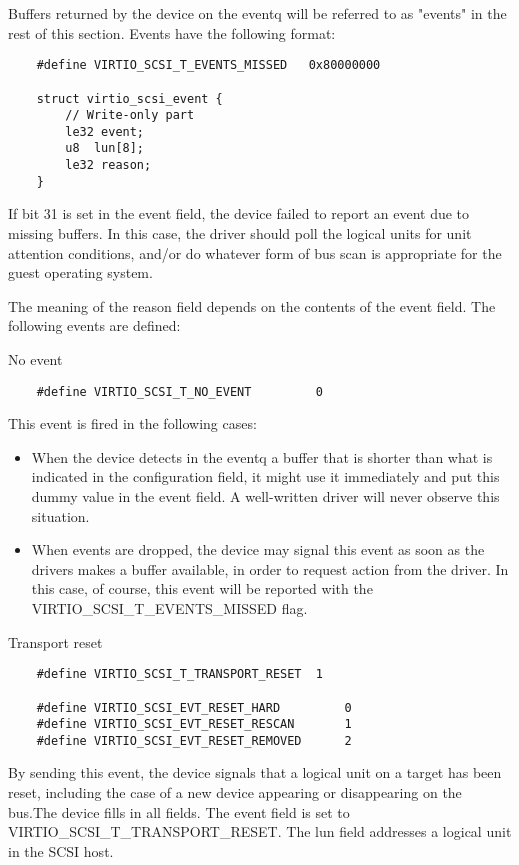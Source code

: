 Buffers returned by the device on the eventq will be referred to
as "events" in the rest of this section. Events have the
following format:

\begin{lstlisting}
	#define VIRTIO_SCSI_T_EVENTS_MISSED   0x80000000

	struct virtio_scsi_event {
		// Write-only part
		le32 event;
		u8  lun[8];
		le32 reason;
	}
\end{lstlisting}

If bit 31 is set in the event field, the device failed to report
an event due to missing buffers. In this case, the driver should
poll the logical units for unit attention conditions, and/or do
whatever form of bus scan is appropriate for the guest operating
system.

The meaning of the reason field depends on the
contents of the event field. The following events are defined:

  No event
\begin{lstlisting}
	#define VIRTIO_SCSI_T_NO_EVENT         0
\end{lstlisting}

  This event is fired in the following cases:

\begin{itemize}
\item When the device detects in the eventq a buffer that is
    shorter than what is indicated in the configuration field, it
    might use it immediately and put this dummy value in the
    event field. A well-written driver will never observe this
    situation.

\item When events are dropped, the device may signal this event as
    soon as the drivers makes a buffer available, in order to
    request action from the driver. In this case, of course, this
    event will be reported with the VIRTIO_SCSI_T_EVENTS_MISSED
    flag.
\end{itemize}

  Transport reset
\begin{lstlisting}
	#define VIRTIO_SCSI_T_TRANSPORT_RESET  1

	#define VIRTIO_SCSI_EVT_RESET_HARD         0
	#define VIRTIO_SCSI_EVT_RESET_RESCAN       1
	#define VIRTIO_SCSI_EVT_RESET_REMOVED      2
\end{lstlisting}

  By sending this event, the device signals that a logical unit
  on a target has been reset, including the case of a new device
  appearing or disappearing on the bus.The device fills in all
  fields. The event field is set to
  VIRTIO_SCSI_T_TRANSPORT_RESET. The lun field addresses a
  logical unit in the SCSI host.

